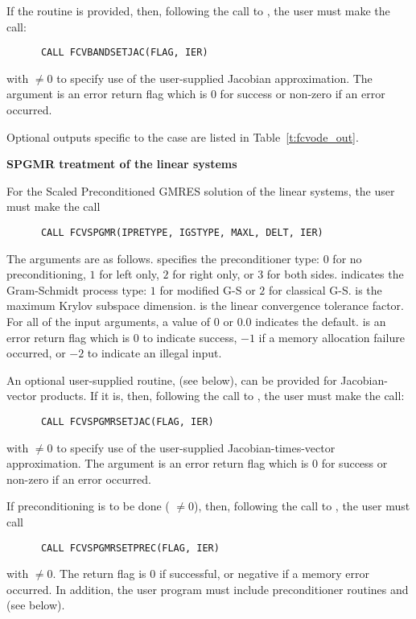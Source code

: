 \begin{Steps}
  If the  routine is provided, then, following the call to ,
  the user must make the call:
\begin{verbatim}
      CALL FCVBANDSETJAC(FLAG, IER)
\end{verbatim}
  with  $\neq 0$ to specify use of the user-supplied Jacobian approximation.
  The argument  is an error return flag which is $0$ 
  for success or non-zero if an error occurred.
  
  Optional outputs specific to the {\band} case are listed in Table~\ref{t:fcvode_out}.

  
  {\s}{\p} {\bf SPGMR treatment of the linear systems}
  
  For the Scaled Preconditioned GMRES solution of the linear systems,
  the user must make the call
\begin{verbatim}
      CALL FCVSPGMR(IPRETYPE, IGSTYPE, MAXL, DELT, IER)
\end{verbatim}
  The arguments are as follows.
   specifies the preconditioner type: 
  $0$ for no preconditioning, $1$ for left only, $2$ for right only, or $3$ for
  both sides.  indicates the Gram-Schmidt process type: 
  $1$ for modified G-S or $2$ for classical G-S.
   is the maximum Krylov subspace dimension.
   is the linear convergence tolerance factor.
  For all of the input arguments, a value of $0$ or $0.0$ indicates the default.
   is an error return flag which is $0$ to indicate success, $-1$
  if a memory allocation failure occurred, or $-2$ to indicate an illegal input.
  
  An optional user-supplied routine,  (see below), can be provided for
  Jacobian-vector products.  If it is, then, following the call to
  , the user must make the call:
\begin{verbatim}
      CALL FCVSPGMRSETJAC(FLAG, IER)
\end{verbatim}
  with  $\neq 0$ to specify use of the user-supplied
  Jacobian-times-vector approximation.
  The argument  is an error return flag which is $0$ 
  for success or non-zero if an error occurred.
  
  If preconditioning is to be done ( $\neq 0$), then, following the
  call to , the user must call
\begin{verbatim}
      CALL FCVSPGMRSETPREC(FLAG, IER)
\end{verbatim}
  with  $\neq 0$.  The return flag  is 0 if
  successful, or negative if a memory error occurred.
  In addition, the user program must include
  preconditioner routines  and  (see below).


\end{Steps}
